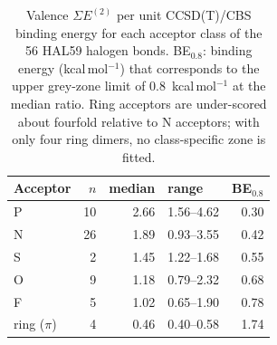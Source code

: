 \begin{table}[!htbp]\centering\small
\caption{Valence $\Sigma E^{(2)}$ per unit CCSD(T)/CBS binding energy for each acceptor class of the 56 HAL59 halogen bonds. BE$_{0.8}$: binding energy (kcal\,mol$^{-1}$) that corresponds to the upper grey-zone limit of 0.8~kcal\,mol$^{-1}$ at the median ratio. Ring acceptors are under-scored about fourfold relative to N acceptors; with only four ring dimers, no class-specific zone is fitted.}\label{tab:classratio}
\begin{tabular}{lrrlr}\toprule Acceptor & $n$ & median & range & BE$_{0.8}$\\\midrule
P & 10 & 2.66 & 1.56--4.62 & 0.30\\
N & 26 & 1.89 & 0.93--3.55 & 0.42\\
S & 2 & 1.45 & 1.22--1.68 & 0.55\\
O & 9 & 1.18 & 0.79--2.32 & 0.68\\
F & 5 & 1.02 & 0.65--1.90 & 0.78\\
ring ($\pi$) & 4 & 0.46 & 0.40--0.58 & 1.74\\
\bottomrule\end{tabular}\end{table}
